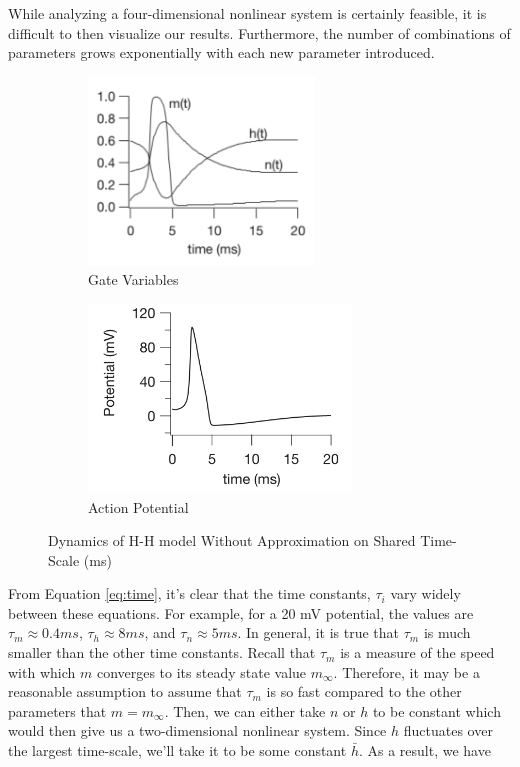 \documentclass[12]{book}
\newcommand\0{\mathbf{0}}
\newcommand\<{\langle}
\renewcommand\>{\rangle}
\begin{document}
While analyzing a four-dimensional nonlinear system is certainly feasible, it is difficult to then visualize our results. Furthermore, the number of combinations of parameters grows exponentially with each new parameter introduced.

\begin{figure}[H]
\centering
\begin{subfigure}{.5\textwidth}
	\centering
	\includegraphics[height=5cm]{keener1.png}
	\caption{Gate Variables}
\end{subfigure}%
\begin{subfigure}{.5\textwidth}
	\centering
	\includegraphics[height=5cm]{keener2.png}
	\caption{Action Potential}
\end{subfigure}
	\caption{Dynamics of H-H model Without Approximation on Shared Time-Scale (ms)}
	\label{fig:keen}
\end{figure}


From Equation \ref{eq:time}, it's clear that the time constants, $\tau_i$ vary widely between these equations. For example, for a 20 mV potential, the values are $\tau_m \approx 0.4 ms$, $\tau_h \approx 8 ms$, and $\tau_n \approx 5 ms$. In general, it is true that $\tau_m$ is much smaller than the other time constants. Recall that $\tau_m$ is a measure of the speed with which $m$ converges to its steady state value $m_\infty$. Therefore, it may be a reasonable assumption to assume that $\tau_m$ is so fast compared to the other parameters that $m = m_\infty$. Then, we can either take $n$ or $h$ to be constant which would then give us a two-dimensional nonlinear system. Since $h$ fluctuates over the largest time-scale, we'll take it to be some constant $\bar{h}$. As a result, we have 
\end{document}
